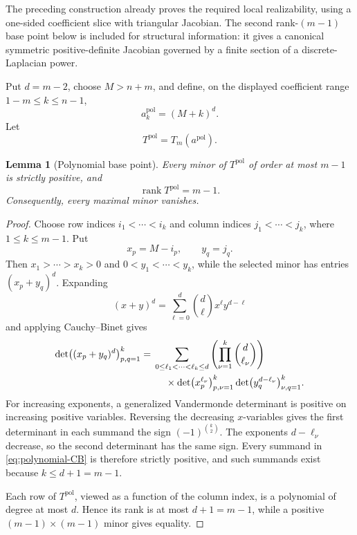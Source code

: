 \documentclass{amsart}
\numberwithin{equation}{section}
\newtheorem{lemma}[theorem]{Lemma}
\theoremstyle{definition}
\theoremstyle{remark}
\DeclareMathOperator{\rank}{rank}
\begin{document}
The preceding construction already proves the required local realizability, using a one-sided coefficient slice with triangular Jacobian.  The second rank-$(m-1)$ base point below is included for structural information: it gives a canonical symmetric positive-definite Jacobian governed by a finite section of a discrete-Laplacian power.

Put $d=m-2$, choose $M>n+m$, and define, on the displayed coefficient range $1-m\le k\le n-1$,
\begin{equation}\label{eq:polynomial-base-coefficients}
 a_k^{\mathrm{pol}}=(M+k)^d.
\end{equation}
Let
\[
 T^{\mathrm{pol}}=T_m(a^{\mathrm{pol}}).
\]

\begin{lemma}[Polynomial base point]\label{lem:polynomial-base}
Every minor of $T^{\mathrm{pol}}$ of order at most $m-1$ is strictly positive, and
\[
 \rank T^{\mathrm{pol}}=m-1.
\]
Consequently, every maximal minor vanishes.
\end{lemma}

\begin{proof}
Choose row indices $i_1<\cdots<i_k$ and column indices $j_1<\cdots<j_k$, where $1\le k\le m-1$.  Put
\[
 x_p=M-i_p,
 \qquad
 y_q=j_q.
\]
Then $x_1>\cdots>x_k>0$ and $0<y_1<\cdots<y_k$, while the selected minor has entries $(x_p+y_q)^d$.  Expanding
\[
 (x+y)^d=\sum_{\ell=0}^d\binom d\ell x^\ell y^{d-\ell}
\]
and applying Cauchy--Binet gives
\begin{align}\label{eq:polynomial-CB}
 \det\bigl((x_p+y_q)^d\bigr)_{p,q=1}^k
 ={}&\sum_{0\le\ell_1<\cdots<\ell_k\le d}
 \left(\prod_{\nu=1}^k\binom d{\ell_\nu}\right)\\
 &\hspace{1.2em}\times
 \det\bigl(x_p^{\ell_\nu}\bigr)_{p,\nu=1}^k
 \det\bigl(y_q^{d-\ell_\nu}\bigr)_{\nu,q=1}^k.\notag
\end{align}
For increasing exponents, a generalized Vandermonde determinant is positive on increasing positive variables.  Reversing the decreasing $x$-variables gives the first determinant in each summand the sign $(-1)^{\binom k2}$.  The exponents $d-\ell_\nu$ decrease, so the second determinant has the same sign.  Every summand in \eqref{eq:polynomial-CB} is therefore strictly positive, and such summands exist because $k\le d+1=m-1$.

Each row of $T^{\mathrm{pol}}$, viewed as a function of the column index, is a polynomial of degree at most $d$.  Hence its rank is at most $d+1=m-1$, while a positive $(m-1)\times(m-1)$ minor gives equality.
\end{proof}
\end{document}
